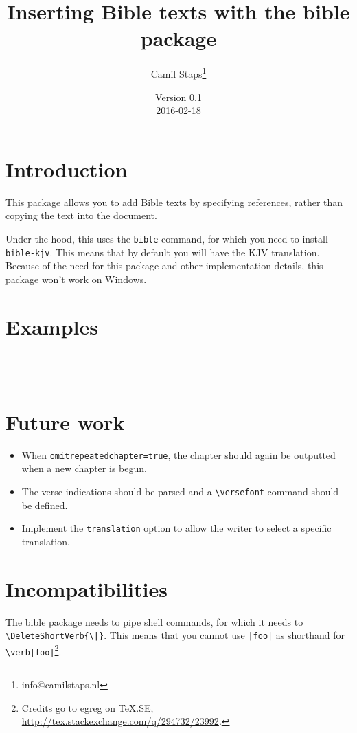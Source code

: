 \documentclass[a4paper]{ltxguide}
\title{Inserting Bible texts with the \textsf{bible} package}
\author{Camil Staps\footnote{info@camilstaps.nl}}
\date{Version 0.1\\2016-02-18}
\newenvironment{example}
  {\VerbatimOut{\jobname.tmp}}
  {\endVerbatimOut
    \begin{framed}
      \setlength{\parskip}{-10pt}
      \inputminted[xleftmargin=-8pt]{latex}{\jobname.tmp}
      \medskip
      
    \end{framed}}
\begin{document}
\maketitle

\section{Introduction}
This package allows you to add Bible texts by specifying references, rather than copying the text into the document.

Under the hood, this uses the \texttt{bible} command, for which you need to install \texttt{bible-kjv}. This means that by default you will have the KJV translation. Because of the need for this package and other implementation details, this package won't work on Windows.

\section{Examples}
\begin{example}
\end{example}

\begin{example}
\end{example}

\begin{example}
\end{example}

\begin{example}
\end{example}

\section{Future work}
\begin{itemize}
  \item When \verb$omitrepeatedchapter=true$, the chapter should again be outputted when a new chapter is begun.
  \item The verse indications should be parsed and a \verb$\versefont$ command should be defined.
  \item Implement the \verb$translation$ option to allow the writer to select a specific translation.
\end{itemize}

\section{Incompatibilities}
The \textsf{bible} package needs to pipe shell commands, for which it needs to \verb$\DeleteShortVerb{\|}$. This means that you cannot use \verb$|foo|$ as shorthand for \verb$\verb|foo|$\footnote{Credits go to egreg on TeX.SE, \url{http://tex.stackexchange.com/q/294732/23992}.}.
\end{document}
